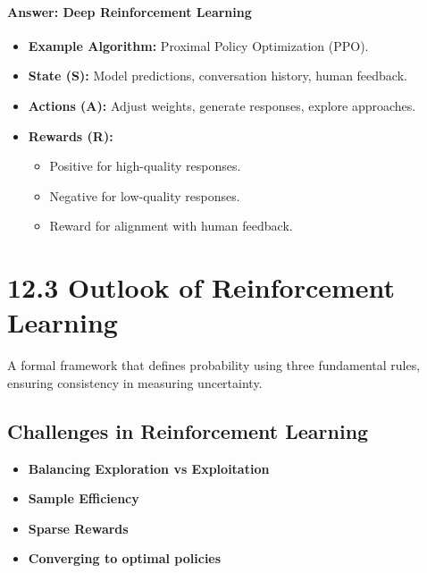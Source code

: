 \documentclass[
  letterpaper,
  DIV=11,
  numbers=noendperiod]{scrreprt}
\providecommand{\tightlist}{%
  \setlength{\itemsep}{0pt}\setlength{\parskip}{0pt}}\usepackage{longtable,booktabs,array}
\begin{document}
\subsubsection{Answer: Deep Reinforcement
Learning}\label{answer-deep-reinforcement-learning}

\begin{itemize}
\tightlist
\item
  \textbf{Example Algorithm:} Proximal Policy Optimization (PPO).
\item
  \textbf{State (S):} Model predictions, conversation history, human
  feedback.
\item
  \textbf{Actions (A):} Adjust weights, generate responses, explore
  approaches.
\item
  \textbf{Rewards (R):}

  \begin{itemize}
  \tightlist
  \item
    Positive for high-quality responses.
  \item
    Negative for low-quality responses.
  \item
    Reward for alignment with human feedback.
  \end{itemize}
\end{itemize}

\chapter{12.3 Outlook of Reinforcement
Learning}\label{outlook-of-reinforcement-learning}

\begin{tcolorbox}[enhanced jigsaw, arc=.35mm, toprule=.15mm, leftrule=.75mm, colback=white, left=2mm, colframe=quarto-callout-note-color-frame, rightrule=.15mm, opacityback=0, breakable, bottomrule=.15mm]

A formal framework that defines probability using three fundamental
rules, ensuring consistency in measuring uncertainty. 🎲

\end{tcolorbox}

\section{Challenges in Reinforcement
Learning}\label{challenges-in-reinforcement-learning}

\begin{itemize}
\item
  \textbf{Balancing Exploration vs Exploitation}
\item
  \textbf{Sample Efficiency}
\item
  \textbf{Sparse Rewards}
\item
  \textbf{Converging to optimal policies}
\end{itemize}
\end{document}
